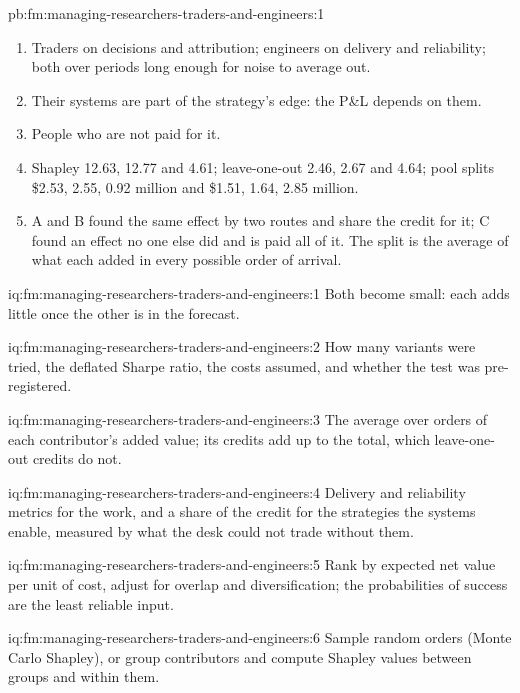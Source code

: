 \begin{solution}{pb:fm:managing-researchers-traders-and-engineers:1}
\begin{enumerate}
\item Traders on decisions and attribution; engineers on delivery and reliability; both over periods long enough for noise to average out.
\item Their systems are part of the strategy's edge: the P\&L depends on them.
\item People who are not paid for it.
\item Shapley 12.63, 12.77 and 4.61; leave-one-out 2.46, 2.67 and 4.64; pool splits \$2.53, 2.55, 0.92 million and \$1.51, 1.64, 2.85 million.
\item A and B found the same effect by two routes and share the credit for it; C found an effect no one else did and is paid all of it. The split
is the average of what each added in every possible order of arrival.
\end{enumerate}
\end{solution}

\begin{solution}{iq:fm:managing-researchers-traders-and-engineers:1}
Both become small: each adds little once the other is in the forecast.
\end{solution}

\begin{solution}{iq:fm:managing-researchers-traders-and-engineers:2}
How many variants were tried, the deflated Sharpe ratio, the costs assumed, and whether the test was pre-registered.
\end{solution}

\begin{solution}{iq:fm:managing-researchers-traders-and-engineers:3}
The average over orders of each contributor's added value; its credits add up to the total, which leave-one-out credits do not.
\end{solution}

\begin{solution}{iq:fm:managing-researchers-traders-and-engineers:4}
Delivery and reliability metrics for the work, and a share of the credit for the strategies the systems enable, measured by what the desk could
not trade without them.
\end{solution}

\begin{solution}{iq:fm:managing-researchers-traders-and-engineers:5}
Rank by expected net value per unit of cost, adjust for overlap and diversification; the probabilities of success are the least reliable input.
\end{solution}

\begin{solution}{iq:fm:managing-researchers-traders-and-engineers:6}
Sample random orders (Monte Carlo Shapley), or group contributors and compute Shapley values between groups and within them.
\end{solution}
